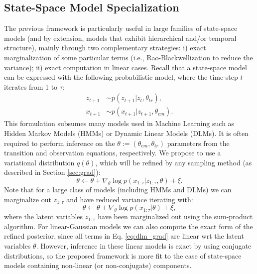 \subsection{State-Space Model Specialization}\label{sec:ss}
The previous framework is particularly useful in large families of state-space models (and by extension, models that exhibit hierarchical and/or temporal structure), mainly through two complementary strategies: i) exact marginalization of some particular terms (i.e., Rao-Blackwellization \parencite{murray2018delayed} to reduce the variance); ii) exact computation in linear cases. %
Recall that a state-space model \parencite{hamilton1994state} can be expressed with the following probabilistic model, where the time-step $t$ iterates from 1 to $\tau$:
\begin{align*}
    z_{t+1} &\sim p(z_{t+1} | z_t, \theta_{tr}), \\
    x_{t+1} &\sim p(x_{t+1} | z_{t+1}, \theta_{em}).
\end{align*}
This formulation subsumes many models used in Machine Learning such as Hidden Markov Models (HMMs) or Dynamic Linear Models (DLMs). It is often required to perform inference on the $\theta := (\theta_{em}, \theta_{tr})$ parameters from the transition and observation equations, respectively. We propose to use a variational distribution $q(\theta)$, which will be refined by any sampling method (as described in Section \ref{sec:grad}):
\begin{equation}
\theta \leftarrow \theta + \nabla_{\theta} \log p(x_{1:\tau}|z_{1:\tau},\theta) + \xi.
\end{equation}
Note that for a large class of models (including HMMs and DLMs) we can marginalize out $z_{1:\tau}$ and have reduced variance iterating with:
\begin{equation}\label{eq:dlm_grad}
\theta \leftarrow \theta + \nabla_{\theta} \log p(x_{1:\tau}|\theta) + \xi,
\end{equation}
where the latent variables $z_{1:\tau}$ have been marginalized out using the sum-product algorithm. For linear-Gaussian models we can also compute the exact form of the refined posterior, since all terms in Eq. \ref{eq:dlm_grad} are linear wrt the latent variables $\theta$. However, inference in these linear models is exact by using conjugate distributions, so the proposed framework is more fit to the case of state-space models containing non-linear (or non-conjugate) components. %
\fi



